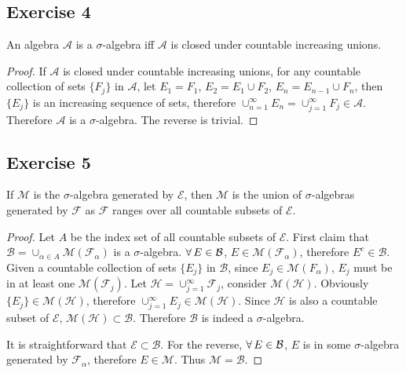 \subsection*{Exercise 4}
An algebra $\mathcal{A}$ is a $\sigma$-algebra iff $\mathcal{A}$ is closed under countable increasing unions.
\begin{proof}
    If $\mathcal{A}$ is closed under countable increasing unions, for any countable collection of sets $\{F_j\}$ in $\mathcal{A}$, let $E_1=F_1$, $E_2=E_1\cup F_2$, $E_n=E_{n-1}\cup F_n$, then $\{E_j\}$ is an increasing sequence of sets, therefore $\cup^{\infty}_{n=1}E_n=\cup^{\infty}_{j=1}F_j\in\mathcal{A}$. Therefore $\mathcal{A}$ is a $\sigma$-algebra. The reverse is trivial.
\end{proof}
\subsection*{Exercise 5}
If $\mathcal{M}$ is the $\sigma$-algebra generated by $\mathcal{E}$, then $\mathcal{M}$ is the union of $\sigma$-algebras generated by $\mathcal{F}$ as $\mathcal{F}$ ranges over all countable subsets of $\mathcal{E}$.
\begin{proof}
    Let $A$ be the index set of all countable subsets of $\mathcal{E}$. First claim that $\mathcal{B}=\cup_{\alpha\in A}\mathcal{M}(\mathcal{F}_{\alpha})$ is a $\sigma$-algebra. $\forall\, E\in\mathcal{B}$, $E\in\mathcal{M}(\mathcal{F}_\alpha)$, therefore $E^c\in\mathcal{B}$. Given a countable collection of sets $\{E_j\}$ in $\mathcal{B}$, since $E_j\in\mathcal{M}({F_\alpha})$, $E_j$ must be in at least one $\mathcal{M}(\mathcal{F}_j)$. Let $\mathcal{H}=\cup^{\infty}_{j=1}\mathcal{F}_j$, consider $\mathcal{M}(\mathcal{H})$. Obviously $\{E_j\}\in\mathcal{M}(\mathcal{H})$, therefore $\cup^\infty_{j=1}E_j\in\mathcal{M}(\mathcal{H})$. Since $\mathcal{H}$ is also a countable subset of $\mathcal{E}$, $\mathcal{M}(\mathcal{H})\subset\mathcal{B}$. Therefore $\mathcal{B}$ is indeed a $\sigma$-algebra.
    \par It is straightforward that $\mathcal{E}\subset\mathcal{B}$. For the reverse, $\forall\, E\in\mathcal{B}$, $E$ is in some $\sigma$-algebra generated by $\mathcal{F}_\alpha$, therefore $E\in\mathcal{M}$. Thus $\mathcal{M}=\mathcal{B}$.
\end{proof}
